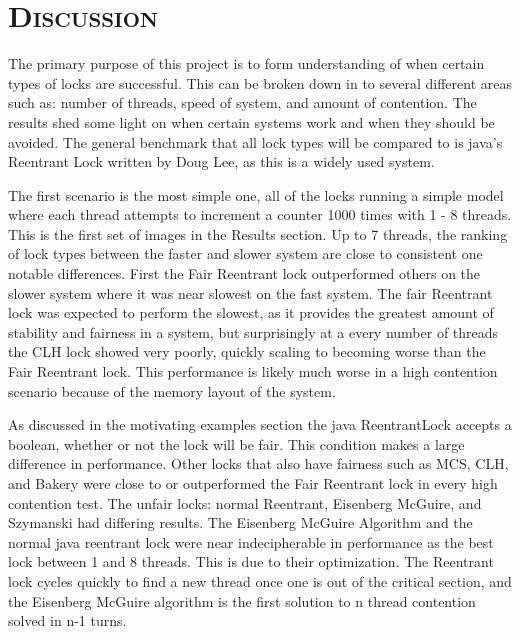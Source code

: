 \documentclass[FinalReport.tex]{subfiles}
\begin{document}
\bigskip

\section*{\textsc{\Large Discussion}}

The primary purpose of this project is to form understanding of when certain types of locks are successful. This can be broken down in to several different areas such as: number of threads, speed of system, and amount of contention. The results shed some light on when certain systems work and when they should be avoided. The general benchmark that all lock types will be compared to is java's Reentrant Lock written by Doug Lee, as this is a widely used system.

The first scenario is the most simple one, all of the locks running a simple model where each thread attempts to increment a counter 1000 times with 1 - 8 threads. This is the first set of images in the Results section. Up to 7 threads, the ranking of lock types between the faster and slower system are close to consistent one notable differences. First the Fair Reentrant lock outperformed others on the slower system where it was near slowest on the fast system. The fair Reentrant lock was expected to perform the slowest, as it provides the greatest amount of stability and fairness in a system, but surprisingly at a every number of threads the CLH lock showed very poorly, quickly scaling to becoming worse than the Fair Reentrant lock. This performance is likely much worse in a high contention scenario because of the memory layout of the system. 

As discussed in the motivating examples section the java ReentrantLock accepts a boolean, whether or not the lock will be fair. This condition makes a large difference in performance. Other locks that also have fairness such as MCS, CLH, and Bakery were close to or outperformed the Fair Reentrant lock in every high contention test. The unfair locks: normal Reentrant, Eisenberg McGuire, and Szymanski had differing results. The Eisenberg McGuire Algorithm and the normal java reentrant lock were near indecipherable in performance as the best lock between 1 and 8 threads. This is due to their optimization. The Reentrant lock cycles quickly to find a new thread once one is out of the critical section, and the Eisenberg McGuire algorithm is the first solution to n thread contention solved in n-1 turns. 
\end{document}
